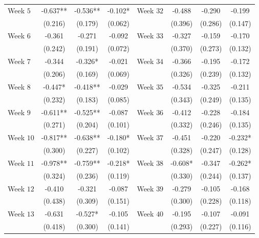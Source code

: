 \begin{table}[htbp]
\begin{tabular}{lccc lccc}
Week $5$  & -0.637** & -0.536** & -0.102* & Week $32$ & -0.488 & -0.290 & -0.199 \\
          & (0.216)  & (0.179)  & (0.062) &           & (0.396) & (0.286) & (0.147) \\

Week $6$  & -0.361 & -0.271 & -0.092 & Week $33$ & -0.327 & -0.159 & -0.170 \\
          & (0.242) & (0.191) & (0.072) &           & (0.370) & (0.273) & (0.132) \\

Week $7$  & -0.344 & -0.326* & -0.021 & Week $34$ & -0.366 & -0.195 & -0.172 \\
          & (0.206) & (0.169) & (0.069) &           & (0.326) & (0.239) & (0.132) \\

Week $8$  & -0.447* & -0.418** & -0.029 & Week $35$ & -0.534 & -0.325 & -0.211 \\
          & (0.232) & (0.183) & (0.085) &           & (0.343) & (0.249) & (0.135) \\

Week $9$  & -0.611** & -0.525** & -0.087 & Week $36$ & -0.412 & -0.228 & -0.184 \\
          & (0.271)  & (0.204)  & (0.101) &           & (0.332) & (0.246) & (0.135) \\

Week $10$ & -0.817** & -0.638** & -0.180* & Week $37$ & -0.451 & -0.220 & -0.232* \\
          & (0.300)  & (0.227)  & (0.102) &           & (0.328) & (0.247) & (0.128) \\

Week $11$ & -0.978** & -0.759** & -0.218* & Week $38$ & -0.608* & -0.347 & -0.262* \\
          & (0.324)  & (0.236)  & (0.119) &           & (0.330) & (0.244) & (0.137) \\

Week $12$ & -0.410 & -0.321 & -0.087 & Week $39$ & -0.279 & -0.105 & -0.168 \\
          & (0.438) & (0.309) & (0.151) &           & (0.300) & (0.228) & (0.118) \\

Week $13$ & -0.631 & -0.527* & -0.105 & Week $40$ & -0.195 & -0.107 & -0.091 \\
          & (0.418) & (0.300) & (0.141) &           & (0.293) & (0.227) & (0.116) \\


\end{tabular}
\end{table}
